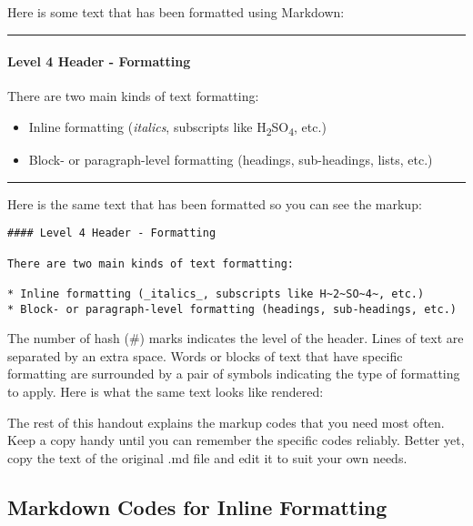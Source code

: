 \documentclass[
]{article}
\providecommand{\tightlist}{%
  \setlength{\itemsep}{0pt}\setlength{\parskip}{0pt}}
\begin{document}
Here is some text that has been formatted using Markdown:

\begin{center}\rule{0.5\linewidth}{0.5pt}\end{center}

\hypertarget{level-4-header---formatting}{%
\paragraph{Level 4 Header -
Formatting}\label{level-4-header---formatting}}

There are two main kinds of text formatting:

\begin{itemize}
\tightlist
\item
  Inline formatting (\emph{italics}, subscripts like
  H\textsubscript{2}SO\textsubscript{4}, etc.)
\item
  Block- or paragraph-level formatting (headings, sub-headings, lists,
  etc.)
\end{itemize}

\begin{center}\rule{0.5\linewidth}{0.5pt}\end{center}

Here is the same text that has been formatted so you can see the markup:

\begin{verbatim}
#### Level 4 Header - Formatting

There are two main kinds of text formatting:

* Inline formatting (_italics_, subscripts like H~2~SO~4~, etc.)
* Block- or paragraph-level formatting (headings, sub-headings, etc.)
\end{verbatim}

The number of hash (\#) marks indicates the level of the header. Lines
of text are separated by an extra space. Words or blocks of text that
have specific formatting are surrounded by a pair of symbols indicating
the type of formatting to apply. Here is what the same text looks like
rendered:

The rest of this handout explains the markup codes that you need most
often. Keep a copy handy until you can remember the specific codes
reliably. Better yet, copy the text of the original .md file and edit it
to suit your own needs.

\hypertarget{markdown-codes-for-inline-formatting}{%
\subsection{Markdown Codes for Inline
Formatting}\label{markdown-codes-for-inline-formatting}}
\end{document}
